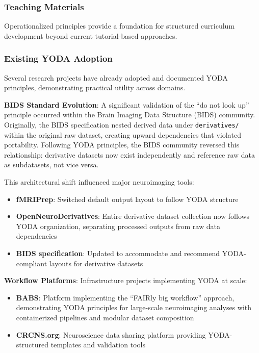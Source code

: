 \documentclass{article}
\begin{document}
\subsubsection{Teaching Materials}
Operationalized principles provide a foundation for structured curriculum development beyond current tutorial-based approaches.

\subsubsection{Existing YODA Adoption}
Several research projects have already adopted and documented YODA principles, demonstrating practical utility across domains.

\textbf{BIDS Standard Evolution}: A significant validation of the ``do not look up'' principle occurred within the Brain Imaging Data Structure (BIDS) community.
Originally, the BIDS specification nested derived data under \texttt{derivatives/} within the original raw dataset, creating upward dependencies that violated portability.
Following YODA principles, the BIDS community reversed this relationship: derivative datasets now exist independently and reference raw data as subdatasets, not vice versa.

This architectural shift influenced major neuroimaging tools:
\begin{itemize}
    \item \textbf{fMRIPrep}: Switched default output layout to follow YODA structure
    \item \textbf{OpenNeuroDerivatives}: Entire derivative dataset collection now follows YODA organization, separating processed outputs from raw data dependencies
    \item \textbf{BIDS specification}: Updated to accommodate and recommend YODA-compliant layouts for derivative datasets
\end{itemize}

\textbf{Workflow Platforms}: Infrastructure projects implementing YODA at scale:
\begin{itemize}
    \item \textbf{BABS}: Platform implementing the ``FAIRly big workflow'' approach, demonstrating YODA principles for large-scale neuroimaging analyses with containerized pipelines and modular dataset composition
    \item \textbf{CRCNS.org}: Neuroscience data sharing platform providing YODA-structured templates and validation tools
\end{itemize}
\end{document}
